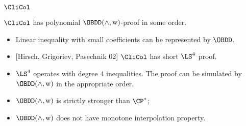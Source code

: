 \begin{frame}{$\CliCol$}

    \begin{theorem}
        $\CliCol$ has polynomial $\OBDD(\land, \weakening)$-proof in some order.
    \end{theorem}

    \pause

    \begin{itemize}
        \item Linear inequality with small coefficients can be represented by $\OBDD$.
        \pause
        \item{} [Hirsch, Grigoriev, Pasechnik 02] $\CliCol$ has short $\LS^4$ proof.
        \pause
        \item $\LS^4$ operates with degree $4$ inequalities. The proof can be simulated by $\OBDD(\land,
            \weakening)$ in the appropriate order.
    \end{itemize}

    \pause
    \begin{corollary}
        \begin{itemize}
            \item $\OBDD(\land, \weakening)$ is strictly stronger than $\CP^*$;
            \item $\OBDD(\land, \weakening)$ does not have monotone interpolation property.
        \end{itemize}
    \end{corollary}

\end{frame}


